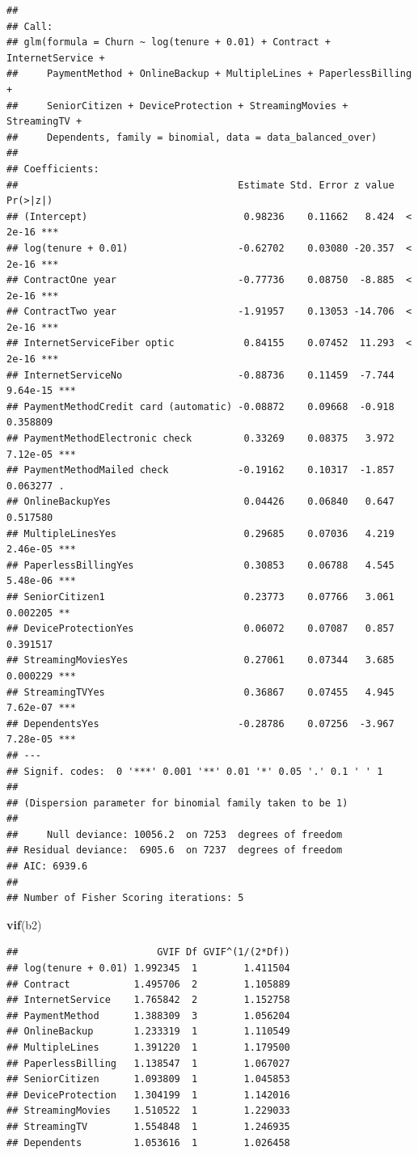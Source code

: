 \documentclass[
  twoside]{article}
\newenvironment{Shaded}{\begin{snugshade}}{\end{snugshade}}
\newcommand{\FunctionTok}[1]{\textcolor[rgb]{0.13,0.29,0.53}{\textbf{#1}}}
\newcommand{\NormalTok}[1]{#1}
\begin{document}
\begin{verbatim}
## 
## Call:
## glm(formula = Churn ~ log(tenure + 0.01) + Contract + InternetService + 
##     PaymentMethod + OnlineBackup + MultipleLines + PaperlessBilling + 
##     SeniorCitizen + DeviceProtection + StreamingMovies + StreamingTV + 
##     Dependents, family = binomial, data = data_balanced_over)
## 
## Coefficients:
##                                      Estimate Std. Error z value Pr(>|z|)    
## (Intercept)                           0.98236    0.11662   8.424  < 2e-16 ***
## log(tenure + 0.01)                   -0.62702    0.03080 -20.357  < 2e-16 ***
## ContractOne year                     -0.77736    0.08750  -8.885  < 2e-16 ***
## ContractTwo year                     -1.91957    0.13053 -14.706  < 2e-16 ***
## InternetServiceFiber optic            0.84155    0.07452  11.293  < 2e-16 ***
## InternetServiceNo                    -0.88736    0.11459  -7.744 9.64e-15 ***
## PaymentMethodCredit card (automatic) -0.08872    0.09668  -0.918 0.358809    
## PaymentMethodElectronic check         0.33269    0.08375   3.972 7.12e-05 ***
## PaymentMethodMailed check            -0.19162    0.10317  -1.857 0.063277 .  
## OnlineBackupYes                       0.04426    0.06840   0.647 0.517580    
## MultipleLinesYes                      0.29685    0.07036   4.219 2.46e-05 ***
## PaperlessBillingYes                   0.30853    0.06788   4.545 5.48e-06 ***
## SeniorCitizen1                        0.23773    0.07766   3.061 0.002205 ** 
## DeviceProtectionYes                   0.06072    0.07087   0.857 0.391517    
## StreamingMoviesYes                    0.27061    0.07344   3.685 0.000229 ***
## StreamingTVYes                        0.36867    0.07455   4.945 7.62e-07 ***
## DependentsYes                        -0.28786    0.07256  -3.967 7.28e-05 ***
## ---
## Signif. codes:  0 '***' 0.001 '**' 0.01 '*' 0.05 '.' 0.1 ' ' 1
## 
## (Dispersion parameter for binomial family taken to be 1)
## 
##     Null deviance: 10056.2  on 7253  degrees of freedom
## Residual deviance:  6905.6  on 7237  degrees of freedom
## AIC: 6939.6
## 
## Number of Fisher Scoring iterations: 5
\end{verbatim}

\begin{Shaded}
\begin{Highlighting}[]
\FunctionTok{vif}\NormalTok{(b2)}
\end{Highlighting}
\end{Shaded}

\begin{verbatim}
##                        GVIF Df GVIF^(1/(2*Df))
## log(tenure + 0.01) 1.992345  1        1.411504
## Contract           1.495706  2        1.105889
## InternetService    1.765842  2        1.152758
## PaymentMethod      1.388309  3        1.056204
## OnlineBackup       1.233319  1        1.110549
## MultipleLines      1.391220  1        1.179500
## PaperlessBilling   1.138547  1        1.067027
## SeniorCitizen      1.093809  1        1.045853
## DeviceProtection   1.304199  1        1.142016
## StreamingMovies    1.510522  1        1.229033
## StreamingTV        1.554848  1        1.246935
## Dependents         1.053616  1        1.026458
\end{verbatim}
\end{document}
